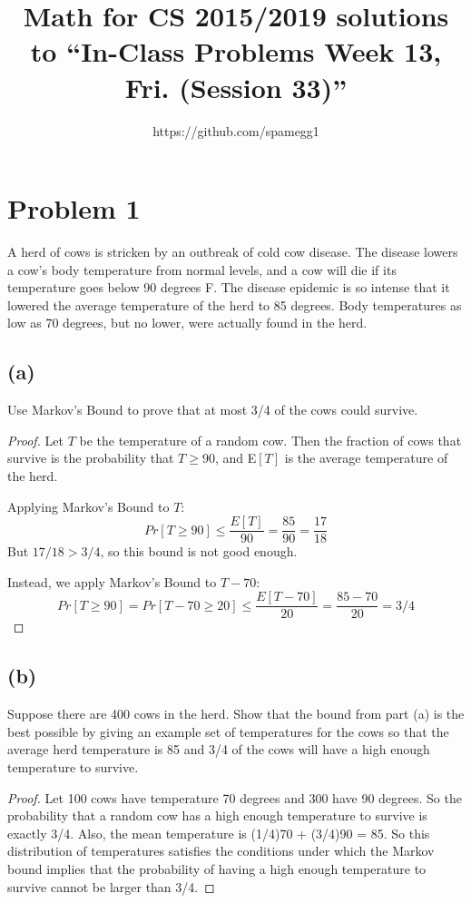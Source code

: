 \documentclass[14pt]{extarticle}
\title{Math for CS 2015/2019 solutions to ``In-Class Problems Week 13, Fri. (Session 33)''}
\author{https://github.com/spamegg1}
\begin{document}
\maketitle
\tableofcontents

\section{Problem 1}
A herd of cows is stricken by an outbreak of cold cow disease. The disease lowers a cow’s body temperature from normal levels, and a cow will die if its temperature goes below 90 degrees F. The disease epidemic is so intense that it lowered the average temperature of the herd to 85 degrees. Body temperatures as low as 70 degrees, but no lower, were actually found in the herd.

\subsection{(a)}
Use Markov’s Bound to prove that at most 3/4 of the cows could survive.

\begin{proof}
Let $T$ be the temperature of a random cow. Then the fraction of cows that survive is the probability that $T \geq 90$, and E$[T]$ is the average temperature of the herd.

Applying Markov’s Bound to $T$:
$$
Pr[T \geq 90] \leq \frac{E[T]}{90} = \frac{85}{90} = \frac{17}{18}
$$
But $17/18 > 3/4$, so this bound is not good enough.

Instead, we apply Markov’s Bound to $T - 70$:
$$
Pr[T \geq 90] = Pr[T - 70 \geq 20] \leq \frac{E[T - 70]}{20} = \frac{85 - 70}{20} = 3/4
$$
\end{proof}

\subsection{(b)}
Suppose there are 400 cows in the herd. Show that the bound from part (a) is the best possible by giving an example set of temperatures for the cows so that the average herd temperature is 85 and 3/4 of the cows will have a high enough temperature to survive.

\begin{proof}
Let 100 cows have temperature 70 degrees and 300 have 90 degrees. So the probability that a random cow has a high enough temperature to survive is exactly 3/4. Also, the mean temperature is (1/4)70 + (3/4)90 = 85. So this distribution of temperatures satisfies the conditions under which the Markov bound im­plies that the probability of having a high enough temperature to survive cannot be larger than 3/4.
\end{proof}
\end{document}
